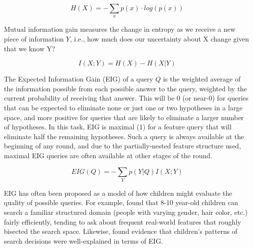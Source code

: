 \documentclass[man,floatsintext]{apa6}
\begin{document}
\begin{equation}
  H(X) = -\sum_{x} p(x) \cdot log(p(x))
\end{equation}

Mutual information gain measures the change in entropy as we receive a new piece 
of information $Y$, i.e., how much does our uncertainty about X change given that 
we know Y?

\begin{equation}
  I(X;Y) = H(X) - H(X|Y)
\end{equation}

The Expected Information Gain (EIG) of a query $Q$ is the weighted average of the 
information possible from each possible answer to the query, weighted by the 
current probability of receiving that answer. This will be 0 (or near-0) for queries that 
can be expected to eliminate none or just one or two hypotheses in a large space, 
and more positive for queries that are likely to eliminate a larger number of 
hypotheses. In this task, EIG is maximal (1) for a feature query that will eliminate 
half the remaining hypotheses. Such a query is always available at the beginning of 
any round, and due to the partially-nested feature structure used, maximal EIG 
queries are often available at other stages of the round.

\begin{equation}
  EIG(Q) = -\sum_{Y} p(Y|Q) I(X;Y)
\end{equation}

EIG has often been proposed as a model of how children might evaluate the quality of possible queries.  For example,  found that 8-10 year-old children can search a familiar structured domain (people with varying gender, hair color, etc.) fairly efficiently, tending to ask about frequent real-world features that roughly bisected the search space. 
 Likewise,  found evidence that children's patterns of search decisions were well-explained in terms of EIG.
\end{document}
